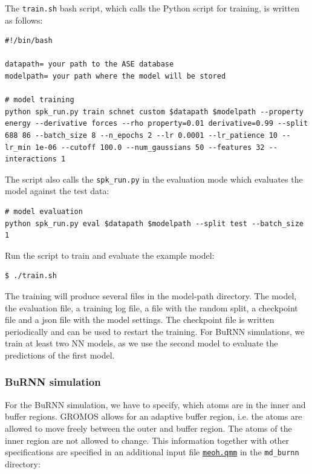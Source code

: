 The \texttt{train.sh} bash script, which calls the Python script for training, is written as follows:
\begin{lstlisting}[breaklines=true, breakatwhitespace=false]
#!/bin/bash

datapath= your path to the ASE database
modelpath= your path where the model will be stored

# model training
python spk_run.py train schnet custom $datapath $modelpath --property energy --derivative forces --rho property=0.01 derivative=0.99 --split 688 86 --batch_size 8 --n_epochs 2 --lr 0.0001 --lr_patience 10 --lr_min 1e-06 --cutoff 100.0 --num_gaussians 50 --features 32 --interactions 1
\end{lstlisting}


The script also calls the \texttt{spk\_run.py} in the evaluation mode which evaluates the model against the test data:

\begin{lstlisting}[breaklines=true, breakatwhitespace=false]
# model evaluation
python spk_run.py eval $datapath $modelpath --split test --batch_size 1
\end{lstlisting}


Run the script to train and evaluate the example model:

\begin{lstlisting}[breaklines=true, breakatwhitespace=false]
$ ./train.sh
\end{lstlisting}


The training will produce several files in the model-path directory. The model, the evaluation file, a training log file, a file with the random split, a checkpoint file and a json file with the model settings. The checkpoint file is written periodically and can be used to restart the training. For BuRNN simulations, we train at least two NN models, as we use the second model to evaluate the predictions of the first model.



\subsubsection{BuRNN simulation}

For the BuRNN simulation, we have to specify, which atoms are in the inner and buffer regions. GROMOS allows for an adaptive buffer region, i.e. the atoms are allowed to move freely between the outer and buffer region. The atoms of the inner region are not allowed to change. This information together with other specifications are specified in an additional input file \href{https://github.com/LierB/gromos_tutorial_livecoms/blob/burnn_tutorial_rc/tutorial_files/t_06/md_burnn/meoh.qmm}{\texttt{meoh.qmm}} in the \texttt{md\_burnn} directory:

